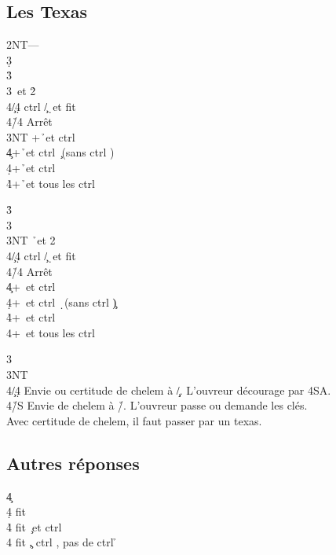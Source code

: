 \documentclass[a4paper]{article}
\begin{document}
\subsection{Les Texas}

\begin{bidtable}
2NT---\\
3\d\+\\
3\h {}\h \\
3\s {}\s\ et 2\h \+\\
4\c/4\d \> ctrl \c /\d\ et fit \s \\
4\h/4\s \> Arrêt\-\\
3NT +\h\ et ctrl \s \\
4\c {}+\h\ et ctrl \c\ (sans ctrl \s )\\
4\d {}+\h\ et ctrl \d \\
4\h {}+\h\ et tous les ctrl\-
\end{bidtable}

\begin{bidtable}
3\h\+\\
3\s {}\s \\
3NT \h\ et 2\s \+\\
4\c/4\d \> ctrl \c /\d\ et fit \h \\
4\h/4\s \> Arrêt\-\\
4\c {}+\s\ et ctrl \c \\
4\d {}+\s\ et ctrl \d\ (sans ctrl \c )\\
4\h {}+\s\ et ctrl \h \\
4\s {}+\s\ et tous les ctrl\-
\end{bidtable}

\begin{bidtable}
3\s\+\\
3NT\+\\
4\c/4\d \> Envie ou certitude de chelem à \c /\d . L'ouvreur décourage par 4SA.\\
4\h/S \> Envie de chelem à \h /\s . L'ouvreur passe ou demande les clés.\\
\>Avec certitude de chelem, il faut passer par un texas.\-\-
\end{bidtable}

\subsection{Autres réponses}

\begin{bidtable}
4\c\+\\
4\d \> fit \d \\
4\h \> fit \c\ et ctrl \h \\
4\s \> fit \c , ctrl \s , pas de ctrl \h \-
\end{bidtable}
\end{document}
